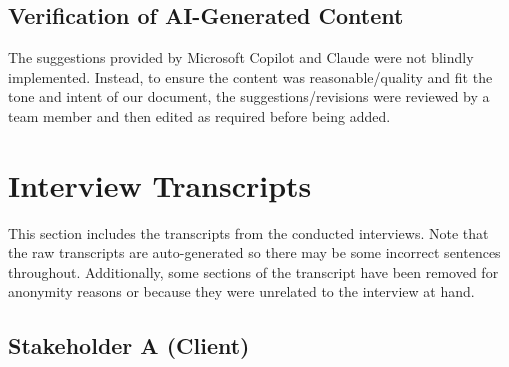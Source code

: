 \documentclass{article}
\begin{document}
\subsection{Verification of AI-Generated Content}

The suggestions provided by Microsoft Copilot and Claude were not blindly implemented. Instead, to ensure the content was reasonable/quality and fit the tone and intent of our document, the suggestions/revisions were reviewed by a team member and then edited as required before being added.

\section{Interview Transcripts}

This section includes the transcripts from the conducted interviews. Note that the raw transcripts are auto-generated so there may be some incorrect sentences throughout. Additionally, some sections of the transcript have been removed for anonymity reasons or because they were unrelated to the interview at hand.

\subsection{Stakeholder A (Client)}
\end{document}
